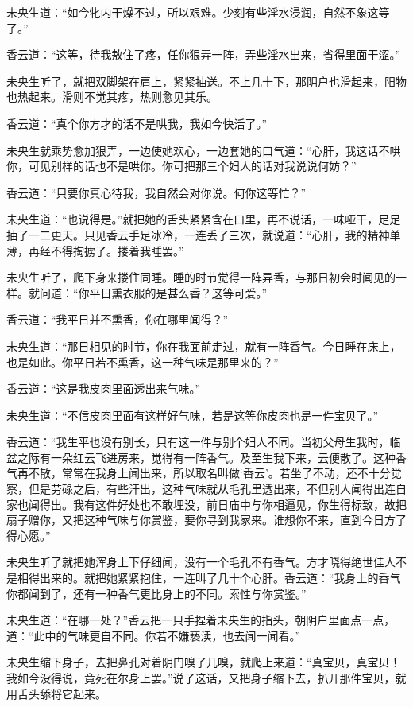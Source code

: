 \documentclass[a4paper,12pt,UTF8,twoside]{ctexbook}
\begin{document}
未央生道：“如今牝内干燥不过，所以艰难。少刻有些淫水浸润，自然不象这等了。”

香云道：“这等，待我敖住了疼，任你狠弄一阵，弄些淫水出来，省得里面干涩。”

未央生听了，就把双脚架在肩上，紧紧抽送。不上几十下，那阴户也滑起来，阳物也热起来。滑则不觉其疼，热则愈见其乐。

香云道：“真个你方才的话不是哄我，我如今快活了。”

未央生就乘势愈加狠弄，一边使她欢心，一边套她的口气道：“心肝，我这话不哄你，可见别样的话也不是哄你。你可把那三个妇人的话对我说说何妨？”

香云道：“只要你真心待我，我自然会对你说。何你这等忙？”

未央生道：“也说得是。”就把她的舌头紧紧含在口里，再不说话，一味哑干，足足抽了一二更天。只见香云手足冰冷，一连丢了三次，就说道：“心肝，我的精神单薄，再经不得掏掳了。搂着我睡罢。”

未央生听了，爬下身来搂住同睡。睡的时节觉得一阵异香，与那日初会时闻见的一样。就问道：“你平日熏衣服的是甚么香？这等可爱。”

香云道：“我平日并不熏香，你在哪里闻得？”

未央生道：“那日相见的时节，你在我面前走过，就有一阵香气。今日睡在床上，也是如此。你平日若不熏香，这一种气味是那里来的？”

香云道：“这是我皮肉里面透出来气味。”

未央生道：“不信皮肉里面有这样好气味，若是这等你皮肉也是一件宝贝了。”

香云道：“我生平也没有别长，只有这一件与别个妇人不同。当初父母生我时，临盆之际有一朵红云飞进房来，觉得有一阵香气。及至生我下来，云便散了。这种香气再不散，常常在我身上闻出来，所以取名叫做‘香云’。若坐了不动，还不十分觉察，但是劳碌之后，有些汗出，这种气味就从毛孔里透出来，不但别人闻得出连自家也闻得出。我有这件好处也不敢埋没，前日庙中与你相逼见，你生得标致，故把扇子赠你，又把这种气味与你赏鉴，要你寻到我家来。谁想你不来，直到今日方了得心愿。”

未央生听了就把她浑身上下仔细闻，没有一个毛孔不有香气。方才晓得绝世佳人不是相得出来的。就把她紧紧抱住，一连叫了几十个心肝。香云道：“我身上的香气你都闻到了，还有一种香气更比身上的不同。索性与你赏鉴。”

未央生道：“在哪一处？”香云把一只手捏着未央生的指头，朝阴户里面点一点，道：“此中的气味更自不同。你若不嫌亵渎，也去闻一闻看。”

未央生缩下身子，去把鼻孔对着阴门嗅了几嗅，就爬上来道：“真宝贝，真宝贝！我如今没得说，竟死在尔身上罢。”说了这话，又把身子缩下去，扒开那件宝贝，就用舌头舔将它起来。
\end{document}
